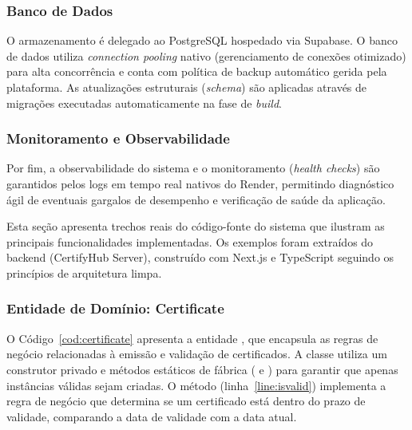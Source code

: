\subsubsection{Banco de Dados}

O armazenamento é delegado ao PostgreSQL hospedado via Supabase. O banco de dados utiliza \textit{connection pooling} nativo (gerenciamento de conexões otimizado) para alta concorrência e conta com política de backup automático gerida pela plataforma. As atualizações estruturais (\textit{schema}) são aplicadas através de migrações executadas automaticamente na fase de \textit{build}.

\subsubsection{Monitoramento e Observabilidade}

Por fim, a observabilidade do sistema e o monitoramento (\textit{health checks}) são garantidos pelos logs em tempo real nativos do Render, permitindo diagnóstico ágil de eventuais gargalos de desempenho e verificação de saúde da aplicação.



\label{sec:exemplos-codigo}

Esta seção apresenta trechos reais do código-fonte do sistema que ilustram as principais funcionalidades implementadas. Os exemplos foram extraídos do backend (CertifyHub Server), construído com Next.js e TypeScript seguindo os princípios de arquitetura limpa.

\subsubsection{Entidade de Domínio: Certificate}
\label{sec:codigo-certificate}

O Código~\ref{cod:certificate} apresenta a entidade , que encapsula as regras de negócio relacionadas à emissão e validação de certificados. A classe utiliza um construtor privado e métodos estáticos de fábrica ( e ) para garantir que apenas instâncias válidas sejam criadas. O método  (linha~\ref{line:isvalid}) implementa a regra de negócio que determina se um certificado está dentro do prazo de validade, comparando a data de validade com a data atual.


